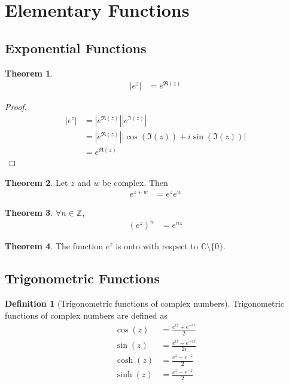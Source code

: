 \documentclass[titlepage, fleqn, a4paper, 12pt, twoside]{article}
\theoremstyle{definition}
\newtheorem{definition}{Definition}
\theoremstyle{theorem}
\newtheorem{theorem}{Theorem}
\begin{document}
\section{Elementary Functions}

\subsection{Exponential Functions}

\begin{theorem}
	\begin{align*}
		\left| e^z \right| & = e^{\Re(z)}
	\end{align*}
\end{theorem}

\begin{proof}
	\begin{align*}
		\left| e^{z} \right| & = \left| e^{\Re(z)} \right| \left| e^{\Im(z)} \right|                                              \\
                                     & = \left| e^{\Re(z)} \right| \left| \cos\left( \Im(z) \right) + i \sin\left( \Im(z) \right) \right| \\
                                     & = e^{\Re(z)}
	\end{align*}
\end{proof}

\begin{theorem}
	Let $z$ and $w$ be complex.
	Then
	\begin{align*}
		e^{z + w} &= e^z e^w
	\end{align*}
\end{theorem}

\begin{theorem}
	$\forall n \in \mathbb{Z}$,
	\begin{align*}
		\left( e^z \right)^n &= e^{n z}
	\end{align*}
\end{theorem}

\begin{theorem}
	The function $e^z$ is onto with respect to $\mathbb{C} \setminus \{0\}$.
\end{theorem}

\subsection{Trigonometric Functions}

\begin{definition}[Trigonometric functions of complex numbers]
	Trigonometric functions of complex numbers are defined as
	\begin{align*}
		\cos(z)  & = \frac{e^{i z} + e^{-i z}}{2}   \\
		\sin(z)  & = \frac{e^{i z} - e^{-i z}}{2 i} \\
		\cosh(z) & = \frac{e^z + e^{-z}}{2}         \\
		\sinh(z) & = \frac{e^z - e^{-z}}{2}
	\end{align*}
\end{definition}
\end{document}
